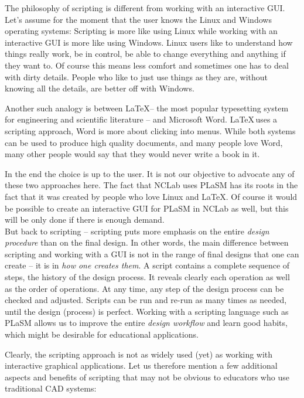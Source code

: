\documentclass{article}
\begin{document}
The philosophy of scripting is different from working with an interactive GUI. 
Let's assume for the moment that the user knows the Linux and Windows operating 
systems: Scripting is more like using Linux while working with an interactive 
GUI is more like using Windows. Linux users like to understand how things really work,
be in control, be able to change everything and anything if they want to. 
Of course this means less comfort and sometimes one has to deal with dirty details. 
People who like to just use things as they are, without knowing all the details, 
are better off with Windows. 

Another such analogy is between \LaTeX -- the most popular typesetting system for engineering 
and scientific literature -- and Microsoft Word. \LaTeX \,uses a scripting approach, Word is more
about clicking into menus. While both systems can be used to produce high quality documents, 
and many people love Word, many other people would say that they would never write a book in it. 

In the end the choice is up to the user. It is not our objective to advocate any
of these two approaches here. The fact that NCLab uses PLaSM has its roots in
the fact that it was created by people who love Linux and \LaTeX. Of course it would be possible 
to create an interactive GUI for PLaSM in NCLab as well, but this will be only done if there 
is enough demand.\\

\noindent
But back to scripting -- scripting puts more emphasis on the entire {\em design procedure}
than on the final design. In other words, the main difference between 
scripting and working with a GUI is not in the range of final designs that one can create 
-- it is in {\em how one creates them}. A script contains 
a complete sequence of steps, the history of the design process. It reveals clearly each 
operation as well as the order of operations. At any time, any step 
of the design process can be checked and adjusted. Scripts can be run and 
re-run as many times as needed, until the design (process) is perfect. 
Working with a scripting language such as PLaSM allows us to improve the entire  
{\em design workflow} and learn good habits, which might be desirable for
educational applications.

Clearly, the scripting approach is not as widely used (yet) as working with 
interactive graphical applications. Let us therefore mention a few 
additional aspects and benefits of scripting that may not be obvious 
to educators who use traditional CAD systems:
\end{document}
